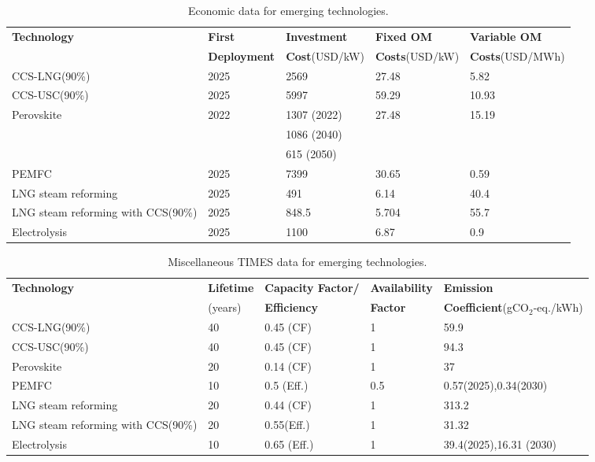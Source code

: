 \begin{table}[!ht]
	\caption{Economic data for emerging technologies.}
	\vspace{0.1in}
\centering
	\begin{tabularx}{1.3\textwidth}{p{} p{} p{} p{} p{} }
		\hline
\textbf{Technology} & \textbf{First} & \textbf{Investment} & \textbf{Fixed \gls{OM}} & \textbf{Variable \gls{OM}} \\
  & \textbf{Deployment}& \textbf{Cost}(USD/kW) & \textbf{Costs}(USD/kW) & \textbf{Costs}(USD/MWh)\\
\hline
CCS-LNG(90\%) & 2025 & 2569 & 27.48 & 5.82 \\
CCS-\gls{USC}(90\%) & 2025 & 5997 & 59.29 & 10.93 \\
Perovskite & 2022 & 1307 (2022) & 27.48 & 15.19 \\
& & 1086 (2040) &  &  \\
& & 615 (2050) &  &  \\
\gls{PEMFC} & 2025 & 7399 & 30.65 & 0.59 \\
LNG steam reforming & 2025 & 491 & 6.14 & 40.4 \\
LNG steam reforming with CCS(90\%) & 2025 & 848.5 & 5.704 & 55.7 \\
Electrolysis & 2025 & 1100 & 6.87 & 0.9 \\
\hline 
\end{tabularx}
\label{emerging-eco}
\end{table}


\begin{table}[!ht]
	\caption{Miscellaneous \gls{TIMES} data for emerging technologies.}
	\vspace{0.1in}
	\begin{tabularx}{1.2\textwidth}{p{} p{} p{} p{}  p{}}
		\hline
\textbf{Technology} &  \textbf{Lifetime} & \textbf{Capacity Factor/}  & \textbf{Availability} & \textbf{Emission}\\
  & (years) &  \textbf{Efficiency} & \textbf{Factor} & \textbf{Coefficient}(gCO$_2$-eq./kWh)\\
\hline
CCS-LNG(90\%) & 40 & 0.45 (CF) & 1 & 59.9\\
CCS-\gls{USC}(90\%) & 40 & 0.45 (CF) & 1 & 94.3\\
Perovskite & 20 & 0.14 (CF) & 1 & 37\\
\gls{PEMFC} & 10 & 0.5 (Eff.) & 0.5 & 0.57(2025),0.34(2030)\\
LNG steam reforming & 20 & 0.44 (CF) & 1 & 313.2\\
LNG steam reforming with CCS(90\%) & 20 & 0.55(Eff.) & 1 & 31.32  \\
Electrolysis & 10 & 0.65 (Eff.) & 1 &  39.4(2025),16.31 (2030) \\
\hline 
\end{tabularx}
\label{emerging-misc}
\end{table}

